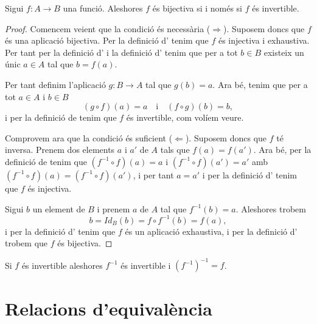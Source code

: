 \documentclass[../Apunts.tex]{subfiles}
\begin{document}
	\begin{theorem}
		\label{thm:bijectiva iff invertible}
		Sigui \(f\colon A\rightarrow B\) una funció. Aleshores \(f\) és bijectiva si i només si \(f\) és invertible.
		\begin{proof}
			Comencem veient que la condició és necessària (\(\Rightarrow\)). Suposem doncs que \(f\) és una aplicació bijectiva. Per la definició d' tenim que \(f\) és injectiva i exhaustiva. Per tant per la definició d' i la definició d' tenim que per a tot \(b\in B\) existeix un únic \(a\in A\) tal que \(b=f(a)\).
			
			Per tant definim l'aplicació \(g\colon B\rightarrow A\) tal que \(g(b)=a\). Ara bé, tenim que per a tot \(a\in A\) i \(b\in B\)
			\[(g\circ f)(a)=a\quad\text{i}\quad(f\circ g)(b)=b,\]
			i per la definició de  tenim que \(f\) és invertible, com volíem veure.
			
			Comprovem ara que la condició és suficient (\(\Leftarrow\)). Suposem doncs que \(f\) té inversa. Prenem dos elements \(a\) i \(a'\) de \(A\) tals que \(f(a)=f(a')\). Ara bé, per la definició de  tenim que \((f^{-1}\circ f)(a)=a\) i \((f^{-1}\circ f)(a')=a'\) amb \((f^{-1}\circ f)(a)=(f^{-1}\circ f)(a')\), i per tant \(a=a'\) i per la definició d' tenim que \(f\) és injectiva.
			
			Sigui \(b\) un element de \(B\) i prenem \(a\) de \(A\) tal que \(f^{-1}(b)=a\). Aleshores trobem
			\[b=Id_{B}(b)=f\circ f^{-1}(b)=f(a),\]
			i per la definició d' tenim que \(f\) és un aplicació exhaustiva, i per la definició d' trobem que \(f\) és bijectiva.
		\end{proof}
	\end{theorem}
	\begin{corollary}
		Si \(f\) és invertible aleshores \(f^{-1}\) és invertible i \(\left(f^{-1}\right)^{-1}=f\).
	\end{corollary}
	\section{Relacions d'equivalència}
\end{document}
